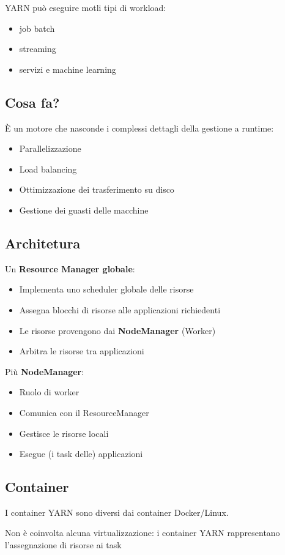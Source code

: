 YARN può eseguire motli tipi di workload:
\begin{itemize}
    \item job batch
    \item streaming
    \item servizi e machine learning
\end{itemize}

\subsection{Cosa fa?}
È un motore che nasconde i complessi dettagli della gestione a runtime:
\begin{itemize}
    \item Parallelizzazione
    \item Load balancing
    \item Ottimizzazione dei trasferimento su disco
    \item Gestione dei guasti delle macchine
\end{itemize}

\subsection{Architetura}
Un \textbf{Resource Manager globale}:
\begin{itemize}
    \item Implementa uno scheduler globale delle risorse
    \item Assegna blocchi di risorse alle applicazioni richiedenti
    \item Le risorse provengono dai \textbf{NodeManager} (Worker)
    \item Arbitra le risorse tra applicazioni
\end{itemize}

Più \textbf{NodeManager}:
\begin{itemize}
    \item Ruolo di worker
    \item Comunica con il ResourceManager
    \item Gestisce le risorse locali
    \item Esegue (i task delle) applicazioni
\end{itemize}

\newpage
\subsection{Container}
\begin{tcolorbox}[title={Disclaimer}]
    I container YARN sono diversi dai container Docker/Linux.

    Non è coinvolta alcuna virtualizzazione: i container YARN rappresentano l'assegnazione di risorse ai task
\end{tcolorbox}


